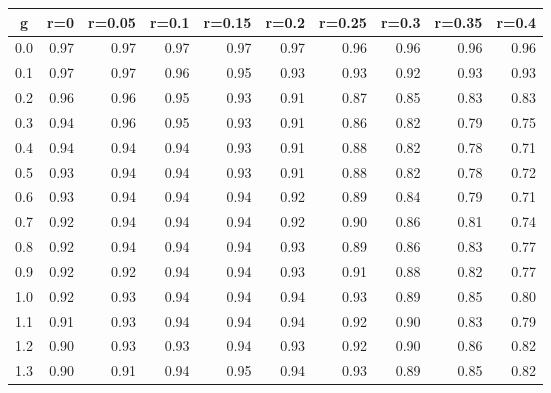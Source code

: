 %
\begin{table}[!tbp]
 \begin{center}
 \begin{tabular}{rrrrrrrrrr}\hline\hline
\multicolumn{1}{c}{g}&\multicolumn{1}{c}{r=0}&\multicolumn{1}{c}{r=0.05}&\multicolumn{1}{c}{r=0.1}&\multicolumn{1}{c}{r=0.15}&\multicolumn{1}{c}{r=0.2}&\multicolumn{1}{c}{r=0.25}&\multicolumn{1}{c}{r=0.3}&\multicolumn{1}{c}{r=0.35}&\multicolumn{1}{c}{r=0.4}\tabularnewline
\hline
0.0&0.97&0.97&0.97&0.97&0.97&0.96&0.96&0.96&0.96\tabularnewline
0.1&0.97&0.97&0.96&0.95&0.93&0.93&0.92&0.93&0.93\tabularnewline
0.2&0.96&0.96&0.95&0.93&0.91&0.87&0.85&0.83&0.83\tabularnewline
0.3&0.94&0.96&0.95&0.93&0.91&0.86&0.82&0.79&0.75\tabularnewline
0.4&0.94&0.94&0.94&0.93&0.91&0.88&0.82&0.78&0.71\tabularnewline
0.5&0.93&0.94&0.94&0.93&0.91&0.88&0.82&0.78&0.72\tabularnewline
0.6&0.93&0.94&0.94&0.94&0.92&0.89&0.84&0.79&0.71\tabularnewline
0.7&0.92&0.94&0.94&0.94&0.92&0.90&0.86&0.81&0.74\tabularnewline
0.8&0.92&0.94&0.94&0.94&0.93&0.89&0.86&0.83&0.77\tabularnewline
0.9&0.92&0.92&0.94&0.94&0.93&0.91&0.88&0.82&0.77\tabularnewline
1.0&0.92&0.93&0.94&0.94&0.94&0.93&0.89&0.85&0.80\tabularnewline
1.1&0.91&0.93&0.94&0.94&0.94&0.92&0.90&0.83&0.79\tabularnewline
1.2&0.90&0.93&0.93&0.94&0.93&0.92&0.90&0.86&0.82\tabularnewline
1.3&0.90&0.91&0.94&0.95&0.94&0.93&0.89&0.85&0.82\tabularnewline
\hline
\end{tabular}

\end{center}

\end{table}

